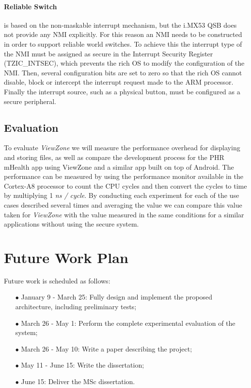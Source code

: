 \paragraph{Reliable Switch} is based on the non-maskable interrupt mechanism, but the i.MX53 QSB does not provide any \ac{NMI} explicitly. For this reason an \ac{NMI} needs to be constructed in order to support reliable world switches. To achieve this the interrupt type of the \ac{NMI} must be assigned as secure in the Interrupt Security Register (TZIC\_INTSEC), which prevents the rich OS to modify the configuration of the \ac{NMI}.
Then, several configuration bits are set to zero so that the rich OS cannot disable, block or intercept the interrupt request made to the ARM processor. Finally the interrupt source, such as a physical button, must be configured as a secure peripheral.

\subsection{Evaluation}

To evaluate \emph{ViewZone} we will measure the performance overhead for displaying and storing files, as well as compare the development process for the PHR mHealth app using ViewZone and a similar app built on top of Android. The performance can be measured by using the performance monitor available in the Cortex-A8 processor to count the CPU cycles and then convert the cycles to time by multiplying 1 \emph{ns / cycle}. By conducting each experiment for each of the use cases described several times and averaging the value we can compare this value taken for \emph{ViewZone} with the value measured in the same conditions for a similar applications without using the secure system.



\section{Future Work Plan}
\label{sec:workplan}

Future work is scheduled as follows:

\begin{itemize}
	\item[$\bullet$] January 9 - March 25: Fully design and implement the proposed architecture, including preliminary tests;
	\item[$\bullet$] March 26 - May 1: Perform the complete experimental evaluation 	of the system;
	\item[$\bullet$] March 26 - May 10: Write a paper describing the project;
	\item[$\bullet$] May 11 - June 15: Write the dissertation;
	\item[$\bullet$] June 15: Deliver the MSc dissertation.
\end{itemize}